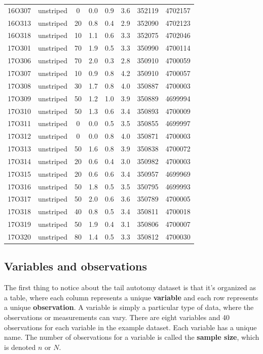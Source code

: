 \documentclass[
]{book}
\begin{document}
\begin{table}[!h]
{\begin{tabular}[t]{cccccccc}
16O307 & unstriped & 0 & 0.0 & 0.9 & 3.6 & 352119 & 4702157\\
16O313 & unstriped & 20 & 0.8 & 0.4 & 2.9 & 352090 & 4702123\\
16O318 & unstriped & 10 & 1.1 & 0.6 & 3.3 & 352075 & 4702046\\
17O301 & unstriped & 70 & 1.9 & 0.5 & 3.3 & 350990 & 4700114\\
\addlinespace
17O306 & unstriped & 70 & 2.0 & 0.3 & 2.8 & 350910 & 4700059\\
17O307 & unstriped & 10 & 0.9 & 0.8 & 4.2 & 350910 & 4700057\\
17O308 & unstriped & 30 & 1.7 & 0.8 & 4.0 & 350887 & 4700003\\
17O309 & unstriped & 50 & 1.2 & 1.0 & 3.9 & 350889 & 4699994\\
17O310 & unstriped & 50 & 1.3 & 0.6 & 3.4 & 350893 & 4700009\\
\addlinespace
17O311 & unstriped & 0 & 0.0 & 0.5 & 3.5 & 350855 & 4699997\\
17O312 & unstriped & 0 & 0.0 & 0.8 & 4.0 & 350871 & 4700003\\
17O313 & unstriped & 50 & 1.6 & 0.8 & 3.9 & 350838 & 4700072\\
17O314 & unstriped & 20 & 0.6 & 0.4 & 3.0 & 350982 & 4700003\\
17O315 & unstriped & 20 & 0.6 & 0.6 & 3.4 & 350957 & 4699969\\
\addlinespace
17O316 & unstriped & 50 & 1.8 & 0.5 & 3.5 & 350795 & 4699993\\
17O317 & unstriped & 50 & 2.0 & 0.6 & 3.6 & 350789 & 4700005\\
17O318 & unstriped & 40 & 0.8 & 0.5 & 3.4 & 350811 & 4700018\\
17O319 & unstriped & 50 & 1.9 & 0.4 & 3.1 & 350806 & 4700007\\
17O320 & unstriped & 80 & 1.4 & 0.5 & 3.3 & 350812 & 4700030\\
\bottomrule
\end{tabular}}
\end{table}

\subsection{Variables and observations}\label{variables-and-observations}

The first thing to notice about the tail autotomy dataset is that it's organized as a table, where each column represents a unique \textbf{variable} and each row represents a unique \textbf{observation}. A variable is simply a particular type of data, where the observations or measurements can vary. There are eight variables and 40 observations for each variable in the example dataset. Each variable has a unique name. The number of observations for a variable is called the \textbf{sample size}, which is denoted \(n\) or \(N\).
\end{document}
